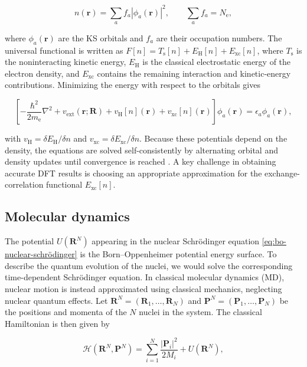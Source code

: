 \documentclass[12pt,a4paper]{article}
\numberwithin{equation}{section}
\begin{document}
\begin{equation}
  n(\bm r)=\sum_a f_a|\phi_a(\bm r)|^2,
  \qquad \sum_a f_a=N_{\mathrm e},
  \label{eq:kohn-sham-density}
\end{equation}

where $\phi_a(\bm r)$ are the KS orbitals and $f_a$ are their occupation numbers.
The universal functional is written as $F[n]=T_{\mathrm s}[n]+E_{\mathrm H}[n]+E_{\mathrm{xc}}[n]$,
where $T_{\mathrm s}$ is the noninteracting kinetic energy,
$E_{\mathrm H}$ is the classical electrostatic energy of the electron
density, and $E_{\mathrm{xc}}$ contains the remaining interaction and
kinetic-energy contributions. Minimizing the energy with respect to the
orbitals gives

\begin{equation}
  \left[-\frac{\hbar^2}{2m_{\mathrm e}}\nabla^2
    +v_{\mathrm{ext}}(\bm r;\bm R)
    +v_{\mathrm H}[n](\bm r)+v_{\mathrm{xc}}[n](\bm r)\right]
    \phi_a(\bm r)=\epsilon_a\phi_a(\bm r),
  \label{eq:kohn-sham-equations}
\end{equation}

with $v_{\mathrm H}=\delta E_{\mathrm H}/\delta n$ and
$v_{\mathrm{xc}}=\delta E_{\mathrm{xc}}/\delta n$. Because these potentials
depend on the density, the equations are solved self-consistently by
alternating orbital and density updates until convergence is reached \cite{kohn1965}.
A key challenge in obtaining accurate DFT results is choosing an appropriate approximation for the exchange-correlation functional $E_{\mathrm{xc}}[n]$.

\subsection{Molecular dynamics}
\label{sec:molecular-dynamics}

The potential $U(\bm R^N)$ appearing in the nuclear Schrödinger equation \eqref{eq:bo-nuclear-schrödinger}
is the Born--Oppenheimer potential energy surface.
To describe the quantum evolution of the nuclei, we would solve the corresponding time-dependent Schrödinger equation.
In classical molecular dynamics (MD), nuclear motion is instead approximated using classical mechanics, neglecting nuclear quantum effects.
Let $\bm R^N=(\bm R_1,\ldots,\bm R_N)$ and $\bm P^N=(\bm P_1,\ldots,\bm P_N)$ be the positions and momenta of the $N$ nuclei in the system.
The classical Hamiltonian is then given by

\begin{equation}
  \mathcal H(\bm R^N,\bm P^N)
    =\sum_{i=1}^{N}\frac{|\bm P_i|^2}{2M_i}+U(\bm R^N),
  \label{eq:classical-hamiltonian}
\end{equation}
\end{document}
